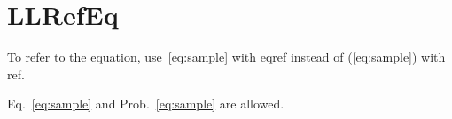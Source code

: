 \section{LLRefEq}

To refer to the equation, use~\eqref{eq:sample} with eqref instead of (\ref{eq:sample}) with ref.

Eq.~\ref{eq:sample} and Prob.~\ref{eq:sample} are allowed.
